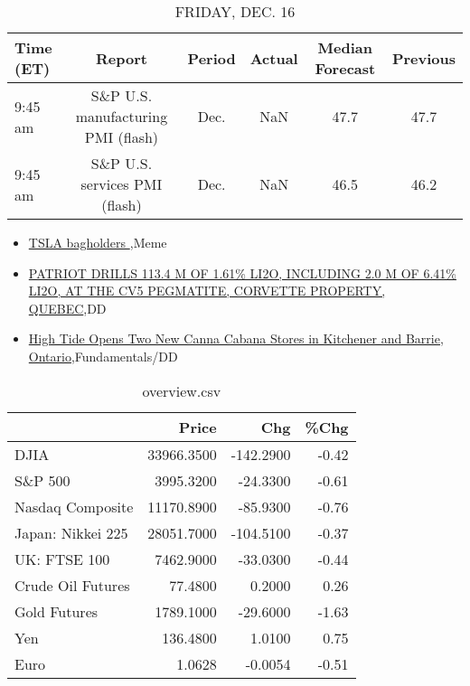 \documentclass{article}%
\begin{document}
%


\begin{table}[htbp]%
\caption{FRIDAY, DEC. 16}%
\centering%
\begin{adjustbox}{width=1\textwidth}%
\begin{tabular}{lccccc}
\toprule
Time (ET) &                             Report & Period & Actual & Median Forecast & Previous \\
\midrule
  9:45 am & S\&P U.S. manufacturing PMI (flash) &   Dec. &    NaN &            47.7 &     47.7 \\
  9:45 am &      S\&P U.S. services PMI (flash) &   Dec. &    NaN &            46.5 &     46.2 \\
\bottomrule
\end{tabular}
%
\end{adjustbox}%
\end{table}

%
\begin{itemize}%
\item%
\href{https://reddit.com/r/wallstreetbets/comments/zmjf4a/tsla\_bagholders/}{TSLA bagholders },Meme%
\item%
\href{https://reddit.com/r/Baystreetbets/comments/zlszby/patriot\_drills\_1134\_m\_of\_161\_li2o\_including\_20\_m/}{PATRIOT DRILLS 113.4 M OF 1.61\% LI2O, INCLUDING 2.0 M OF 6.41\% LI2O, AT THE CV5 PEGMATITE, CORVETTE PROPERTY, QUEBEC},DD%
\item%
\href{https://reddit.com/r/StockMarket/comments/zmjqcl/high\_tide\_opens\_two\_new\_canna\_cabana\_stores\_in/}{High Tide Opens Two New Canna Cabana Stores in Kitchener and Barrie, Ontario},Fundamentals/DD%
\end{itemize}%


\begin{table}[htbp]%
\caption{overview.csv}%
\centering%
\begin{adjustbox}{width=1\textwidth}%
\begin{tabular}{lrrr}
\toprule
                  &      Price &       Chg &  \%Chg \\
\midrule
             DJIA & 33966.3500 & -142.2900 & -0.42 \\
          S\&P 500 &  3995.3200 &  -24.3300 & -0.61 \\
 Nasdaq Composite & 11170.8900 &  -85.9300 & -0.76 \\
Japan: Nikkei 225 & 28051.7000 & -104.5100 & -0.37 \\
     UK: FTSE 100 &  7462.9000 &  -33.0300 & -0.44 \\
Crude Oil Futures &    77.4800 &    0.2000 &  0.26 \\
     Gold Futures &  1789.1000 &  -29.6000 & -1.63 \\
              Yen &   136.4800 &    1.0100 &  0.75 \\
             Euro &     1.0628 &   -0.0054 & -0.51 \\
\bottomrule
\end{tabular}
%
\end{adjustbox}%
\end{table}
\end{document}
